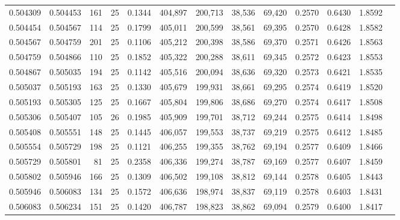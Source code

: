 \begin{tabular}{rrrrrrrrrrrrr}
0.504309 & 0.504453 &   161 &  25 &                                     0.1344 & 404,897 & 200,713 &  38,536 &  69,420 & 0.2570 & 0.6430 & 1.8592 \\
0.504454 & 0.504567 &   114 &  25 &                                     0.1799 & 405,011 & 200,599 &  38,561 &  69,395 & 0.2570 & 0.6428 & 1.8582 \\
0.504567 & 0.504759 &   201 &  25 &                                     0.1106 & 405,212 & 200,398 &  38,586 &  69,370 & 0.2571 & 0.6426 & 1.8563 \\
0.504759 & 0.504866 &   110 &  25 &                                     0.1852 & 405,322 & 200,288 &  38,611 &  69,345 & 0.2572 & 0.6423 & 1.8553 \\
0.504867 & 0.505035 &   194 &  25 &                                     0.1142 & 405,516 & 200,094 &  38,636 &  69,320 & 0.2573 & 0.6421 & 1.8535 \\
0.505037 & 0.505193 &   163 &  25 &                                     0.1330 & 405,679 & 199,931 &  38,661 &  69,295 & 0.2574 & 0.6419 & 1.8520 \\
0.505193 & 0.505305 &   125 &  25 &                                     0.1667 & 405,804 & 199,806 &  38,686 &  69,270 & 0.2574 & 0.6417 & 1.8508 \\
0.505306 & 0.505407 &   105 &  26 &                                     0.1985 & 405,909 & 199,701 &  38,712 &  69,244 & 0.2575 & 0.6414 & 1.8498 \\
0.505408 & 0.505551 &   148 &  25 &                                     0.1445 & 406,057 & 199,553 &  38,737 &  69,219 & 0.2575 & 0.6412 & 1.8485 \\
0.505554 & 0.505729 &   198 &  25 &                                     0.1121 & 406,255 & 199,355 &  38,762 &  69,194 & 0.2577 & 0.6409 & 1.8466 \\
0.505729 & 0.505801 &    81 &  25 &                                     0.2358 & 406,336 & 199,274 &  38,787 &  69,169 & 0.2577 & 0.6407 & 1.8459 \\
0.505802 & 0.505946 &   166 &  25 &                                     0.1309 & 406,502 & 199,108 &  38,812 &  69,144 & 0.2578 & 0.6405 & 1.8443 \\
0.505946 & 0.506083 &   134 &  25 &                                     0.1572 & 406,636 & 198,974 &  38,837 &  69,119 & 0.2578 & 0.6403 & 1.8431 \\
0.506083 & 0.506234 &   151 &  25 &                                     0.1420 & 406,787 & 198,823 &  38,862 &  69,094 & 0.2579 & 0.6400 & 1.8417 \\

\end{tabular}
